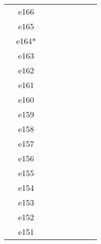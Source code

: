 \documentclass[10pt,letterpaper]{article}
\begin{document}
\begin{center}
\begin{tabular}{ |c|c|c|c|c|c|c|c|c| }
        & e166 &         &                  &            &         &          &                &            \\
        & e165 &         &                  &            &         &          &                &            \\
        & e164* &         &                  &            &         &          &                &            \\
        & e163 &         &                  &            &         &          &                &            \\
        & e162 &         &                  &            &         &          &                &            \\
        & e161 &         &                  &            &         &          &                &            \\
        & e160 &         &                  &            &         &          &                &            \\
        & e159 &         &                  &            &         &          &                &            \\
        & e158 &         &                  &            &         &          &                &            \\
        & e157 &         &                  &            &         &          &                &            \\
        & e156 &         &                  &            &         &          &                &            \\
        & e155 &         &                  &            &         &          &                &            \\
        & e154 &         &                  &            &         &          &                &            \\
        & e153 &         &                  &            &         &          &                &            \\
        & e152 &         &                  &            &         &          &                &            \\
        & e151 &         &                  &            &         &          &                &            \\
        \hline
        \end{tabular}
        \end{center}

    \clearpage
\end{document}
